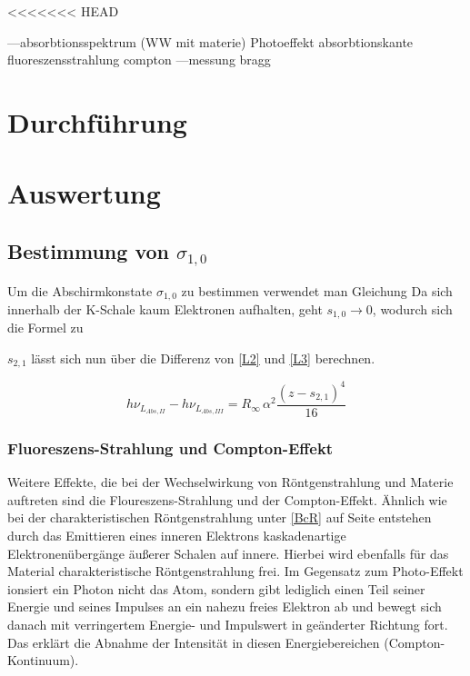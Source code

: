 <<<<<<< HEAD
\newpage

---absorbtionsspektrum (WW mit materie)
Photoeffekt
absorbtionskante
fluoreszensstrahlung
compton
---messung
bragg
\section{Durchführung}

\section{Auswertung}
\subsection{Bestimmung von $\sigma_{1,0}$}
Um die Abschirmkonstate $\sigma_{1,0}$ zu bestimmen verwendet man Gleichung %
Da sich innerhalb der K-Schale kaum Elektronen aufhalten, geht $s_{1,0}\rightarrow 0$, wodurch sich die Formel zu

$s_{2,1}$ lässt sich nun über die Differenz von \eqref{L2} und \eqref{L3} berechnen.

\begin{equation}
 h\nu_{L_{Abs,II}} - h\nu_{L_{Abs,III}} = R_{\infty}\, \alpha^2 \frac{(z-s_{2,1})^4}{16}
\end{equation}

\subsubsection{Fluoreszens-Strahlung und Compton-Effekt}
Weitere Effekte, die bei der Wechselwirkung von Röntgenstrahlung und Materie auftreten sind die Floureszens-Strahlung und 
der Compton-Effekt. Ähnlich wie bei der charakteristischen Röntgenstrahlung unter \ref{BcR} auf Seite \pageref{BcR} entstehen
durch das Emittieren eines inneren Elektrons kaskadenartige Elektronenübergänge äußerer Schalen auf innere. Hierbei wird ebenfalls
für das Material charakteristische Röntgenstrahlung frei. Im Gegensatz zum Photo-Effekt ionsiert ein Photon nicht das Atom,
sondern gibt lediglich einen Teil seiner Energie und seines Impulses an ein nahezu freies Elektron ab und bewegt sich danach
mit verringertem Energie- und Impulswert in geänderter Richtung fort. Das erklärt die Abnahme der Intensität in diesen 
Energiebereichen (Compton-Kontinuum).

